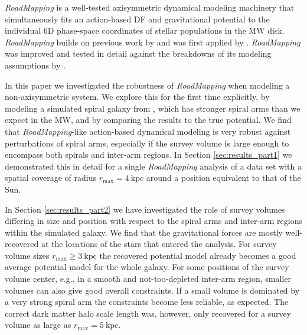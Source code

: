 \documentclass[iop,revtex4,numberedappendix,appendixfloats]{emulateapj}
\newcommand{\RM}{{\sl RoadMapping}}
\begin{document}
\RM{} is a well-tested axisymmetric dynamical modeling machinery that simultaneously fits an action-based DF and gravitational potential to the individual 6D phase-space coordinates of stellar populations in the MW disk. \RM{} builds on previous work by \citet{2011MNRAS.413.1889B,2012MNRAS.426.1324B,2015ApJS..216...29B} and was first applied by \citet{2013ApJ...779..115B}. \RM{} was improved and tested in detail against the breakdowns of its modeling assumptions by \citet{2016ApJ...830...97T}. 

In this paper we investigated the robustness of \RM{} when modeling a non-axisymmetric system. We explore this for the first time explicitly, by modeling a simulated spiral galaxy from \citet{2013ApJ...766...34D}, which has stronger spiral arms than we expect in the MW, and by comparing the results to the true potential. We find that \RM{}-like action-based dynamical modeling is very robust against perturbations of spiral arms, especially if the survey volume is large enough to encompass both spirals and inter-arm regions. In Section \ref{sec:results_part1} we demonstrated this in detail for a single \RM{} analysis of a data set with a spatial coverage of radius $r_\text{max}=4~\text{kpc}$ around a position equivalent to that of the Sun.

In Section \ref{sec:results_part2} we have investigated the role of survey volumes differing in size and position with respect to the spiral arms and inter-arm regions within the simulated galaxy. We find that the gravitational forces are mostly well-recovered at the locations of the stars that entered the analysis. For survey volume sizes $r_\text{max} \geq 3~\text{kpc}$ the recovered potential model already becomes a good average potential model for the whole galaxy. For some positions of the survey volume center, e.g., in a smooth and not-too-depleted inter-arm region, smaller volumes can also give good overall constraints. If a small volume is dominated by a very strong spiral arm the constraints become less reliable, as expected. The correct dark matter halo scale length was, however, only recovered for a survey volume as large as $r_\text{max}=5~\text{kpc}$. 
\end{document}
